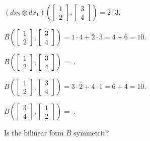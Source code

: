 \documentclass{ximera}
\begin{document}
\begin{question}
\begin{solution}
\begin{hint}
    \end{hint}
    \begin{hint}
      $(dx_2 \otimes dx_1) \left( \begin{bmatrix} 1 \\ 2 \end{bmatrix}, \begin{bmatrix} 3 \\ 4 \end{bmatrix} \right) = 2 \cdot 3$.
    \end{hint}
    \begin{hint}
      $B \left( \begin{bmatrix} 1 \\ 2 \end{bmatrix}, \begin{bmatrix} 3 \\ 4 \end{bmatrix} \right) = 1 \cdot 4 + 2 \cdot 3 = 4 + 6 = 10$.
    \end{hint}

    $B \left( \begin{bmatrix} 1 \\ 2 \end{bmatrix}, \begin{bmatrix} 3 \\ 4 \end{bmatrix} \right) = $ .
  \end{solution}

  \begin{solution}
    \begin{hint}
      $B \left( \begin{bmatrix} 1 \\ 2 \end{bmatrix}, \begin{bmatrix} 3 \\ 4 \end{bmatrix} \right) = 3 \cdot 2 + 4 \cdot 1 = 6 + 4 = 10.$
    \end{hint}

    $B \left( \begin{bmatrix} 3 \\ 4 \end{bmatrix}, \begin{bmatrix} 1 \\ 2 \end{bmatrix} \right) = $ .
  \end{solution}

  Is the bilinear form $B$ symmetric?
  \begin{solution}
    \begin{multiple-choice}
    \end{multiple-choice}
  \end{solution}


\end{question}
\end{document}
